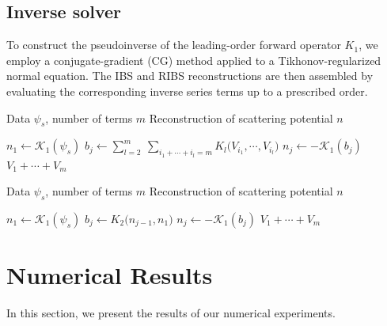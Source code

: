 \documentclass[12pt,reqno]{amsart}
\begin{document}
\subsection{Inverse solver}
To construct the pseudoinverse of the leading-order forward operator $K_1$, we employ a conjugate-gradient (CG) method applied to a Tikhonov-regularized normal equation. The IBS and RIBS reconstructions are then assembled by evaluating the corresponding inverse series terms up to a prescribed order.

\begin{algorithm}[H]
\caption{Inverse Solver using  the Inverse Born Series}
\label{alg:ibs}
\begin{algorithmic}
\Require Data $\psi_s$, number of terms $m$
\Ensure Reconstruction of scattering potential $n$

  \State $n_1 \gets \mathcal{K}_1(\psi_s)$
    \State $b_j \gets \displaystyle \sum_{l=2}^{m}\ \sum_{i_1+\cdots+i_l=m}
      K_l\!\bigl(V_{i_1},\cdots, V_{i_l}\bigr)$
    \State $n_j \gets -\mathcal{K}_1(b_j)$
  \EndFor
  \State \Return $V_1+\cdots+V_m$
\EndFunction

\Statex
\end{algorithmic}
\end{algorithm}
\begin{algorithm}[H]
\caption{Inverse Solver using the Reduced Inverse Born Series}
\label{alg:ribs}
\begin{algorithmic}
\Require Data $\psi_s$, number of terms $m$
\Ensure Reconstruction of scattering potential $n$

  \State $n_1 \gets \mathcal{K}_1(\psi_s)$
    \State $b_j \gets 
      K_2\!\bigl(n_{j-1},n_1\bigr)$
    \State $n_j \gets -\mathcal{K}_1(b_j)$
  \EndFor
  \State \Return $V_1+\cdots+V_m$
\EndFunction

\Statex
\end{algorithmic}
\end{algorithm}

\section{Numerical Results}
In this section, we present the results of our numerical experiments.
\end{document}
